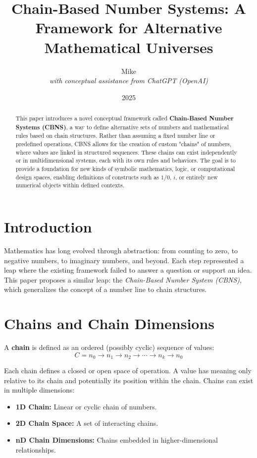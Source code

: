 \documentclass{article}
\title{Chain-Based Number Systems: A Framework for Alternative Mathematical Universes}
\author{Mike \\ \textit{with conceptual assistance from ChatGPT (OpenAI)}}
\date{2025}
\begin{document}
\maketitle

\begin{abstract}
This paper introduces a novel conceptual framework called \textbf{Chain-Based Number Systems (CBNS)}, a way to define alternative sets of numbers and mathematical rules based on chain structures. Rather than assuming a fixed number line or predefined operations, CBNS allows for the creation of custom "chains" of numbers, where values are linked in structured sequences. These chains can exist independently or in multidimensional systems, each with its own rules and behaviors. The goal is to provide a foundation for new kinds of symbolic mathematics, logic, or computational design spaces, enabling definitions of constructs such as $1/0$, $i$, or entirely new numerical objects within defined contexts.
\end{abstract}

\section{Introduction}
Mathematics has long evolved through abstraction: from counting to zero, to negative numbers, to imaginary numbers, and beyond. Each step represented a leap where the existing framework failed to answer a question or support an idea. This paper proposes a similar leap: the \textit{Chain-Based Number System (CBNS)}, which generalizes the concept of a number line to chain structures.

\section{Chains and Chain Dimensions}
A \textbf{chain} is defined as an ordered (possibly cyclic) sequence of values:
\begin{equation*}
C = n_0 \rightarrow n_1 \rightarrow n_2 \rightarrow \cdots \rightarrow n_k \rightarrow n_0
\end{equation*}

Each chain defines a closed or open space of operation. A value has meaning only relative to its chain and potentially its position within the chain. Chains can exist in multiple dimensions:
\begin{itemize}
    \item \textbf{1D Chain:} Linear or cyclic chain of numbers.
    \item \textbf{2D Chain Space:} A set of interacting chains.
    \item \textbf{nD Chain Dimensions:} Chains embedded in higher-dimensional relationships.
\end{itemize}
\end{document}
